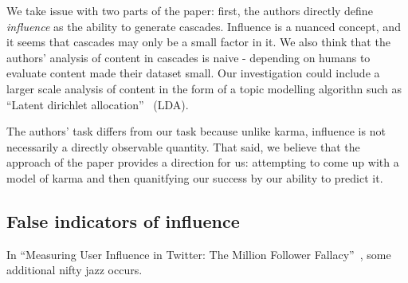 \documentclass[11pt]{article}
\newcommand{\titlecite}[2]{``#1''~\cite{#2}}
\begin{document}
We take issue with two parts of the paper: first, the authors directly define \textit{influence} 
as the ability to generate cascades. Influence is a nuanced concept, and it seems that cascades
may only be a small factor in it. We also think that the authors' analysis of content in cascades
is naive - depending on humans to evaluate content made their dataset small. Our investigation
could include a larger scale analysis of content in the form of a topic modelling algorithn
such as \titlecite{Latent dirichlet allocation}{blei2003latent} (LDA).

The authors' task differs from our task because unlike karma, influence is not necessarily
a directly observable quantity. That said, we believe that the approach of the paper provides a direction
for us: attempting to come up with a model of karma and then quanitfying our success
by our ability to predict it.

\subsection{False indicators of influence}
In \titlecite{Measuring User Influence in Twitter: The Million Follower Fallacy}{cha2010measuring}, 
some additional nifty jazz occurs.
\end{document}
